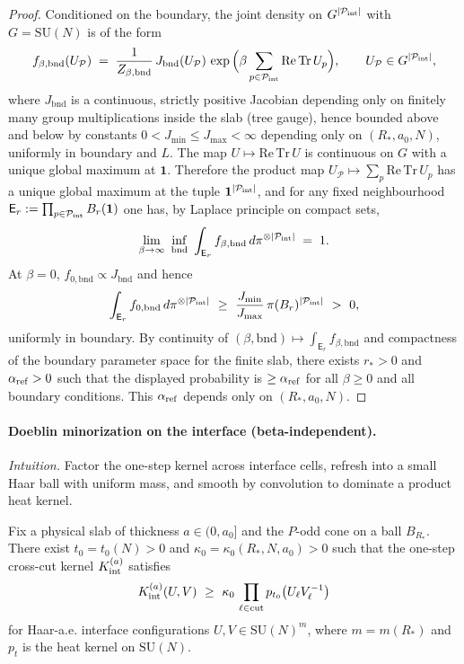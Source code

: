 \documentclass[11pt]{amsart}
\begin{document}
\begin{proof}
Conditioned on the boundary, the joint density on $G^{|\mathcal P_{\rm int}|}$ with $G=\mathrm{SU}(N)$ is of the form
\[
  f_{\beta,\mathrm{bnd}}(U_{\mathcal P})\;=\;\frac{1}{Z_{\beta,\mathrm{bnd}}}\,J_{\mathrm{bnd}}(U_{\mathcal P})\,\exp\Big(\beta\sum_{p\in\mathcal P_{\rm int}} \mathrm{Re\,Tr}\,U_p\Big),\qquad U_{\mathcal P}\in G^{|\mathcal P_{\rm int}|},
\]
where $J_{\mathrm{bnd}}$ is a continuous, strictly positive Jacobian depending only on finitely many group multiplications inside the slab (tree gauge), hence bounded above and below by constants $0<J_{\min}\le J_{\max}<\infty$ depending only on $(R_*,a_0,N)$, uniformly in boundary and $L$. The map $U\mapsto \mathrm{Re\,Tr}\,U$ is continuous on $G$ with a unique global maximum at $\mathbf 1$. Therefore the product map $U_{\mathcal P}\mapsto \sum_{p}\mathrm{Re\,Tr}\,U_p$ has a unique global maximum at the tuple $\mathbf 1^{|\mathcal P_{\rm int}|}$, and for any fixed neighbourhood $\mathsf E_{r}:=\prod_{p\in\mathcal P_{\rm int}} B_r(\mathbf 1)$ one has, by Laplace principle on compact sets,
\[
  \lim_{\beta\to\infty}\ \inf_{\mathrm{bnd}}\ \int_{\mathsf E_r} f_{\beta,\mathrm{bnd}}\,d\pi^{\otimes |\mathcal P_{\rm int}|}\;=\;1.
\]
At $\beta=0$, $f_{0,\mathrm{bnd}}\propto J_{\mathrm{bnd}}$ and hence
\[
  \int_{\mathsf E_r} f_{0,\mathrm{bnd}}\,d\pi^{\otimes |\mathcal P_{\rm int}|}\ \ge\ \frac{J_{\min}}{J_{\max}}\,\pi(B_r)^{|\mathcal P_{\rm int}|}\ >\ 0,
\]
uniformly in boundary. By continuity of $(\beta,\mathrm{bnd})\mapsto \int_{\mathsf E_r} f_{\beta,\mathrm{bnd}}$ and compactness of the boundary parameter space for the finite slab, there exists $r_*>0$ and $\alpha_{\rm ref}>0$ such that the displayed probability is $\ge \alpha_{\rm ref}$ for all $\beta\ge 0$ and all boundary conditions. This $\alpha_{\rm ref}$ depends only on $(R_*,a_0,N)$.
\end{proof}

\paragraph{Doeblin minorization on the interface (beta-independent).} \emph{Intuition.} Factor the one-step kernel across interface cells, refresh into a small Haar ball with uniform mass, and smooth by convolution to dominate a product heat kernel.
\begin{proposition}\label{prop:doeblin-interface}
Fix a physical slab of thickness $a\in(0,a_0]$ and the $P$-odd cone on a ball $B_{R_*}$. There exist $t_0=t_0(N)>0$ and $\kappa_0=\kappa_0(R_*,N,a_0)>0$ such that the one-step cross-cut kernel $K_{\rm int}^{(a)}$ satisfies
\[
  K_{\rm int}^{(a)}(U,V)\ \ge\ \kappa_0\,\prod_{\ell\in\text{cut}} p_{t_0}\big(U_\ell V_\ell^{-1}\big)
\]
for Haar-a.e. interface configurations $U,V\in \mathrm{SU}(N)^{m}$, where $m=m(R_*)$ and $p_{t}$ is the heat kernel on $\mathrm{SU}(N)$.
\end{proposition}
\end{document}

